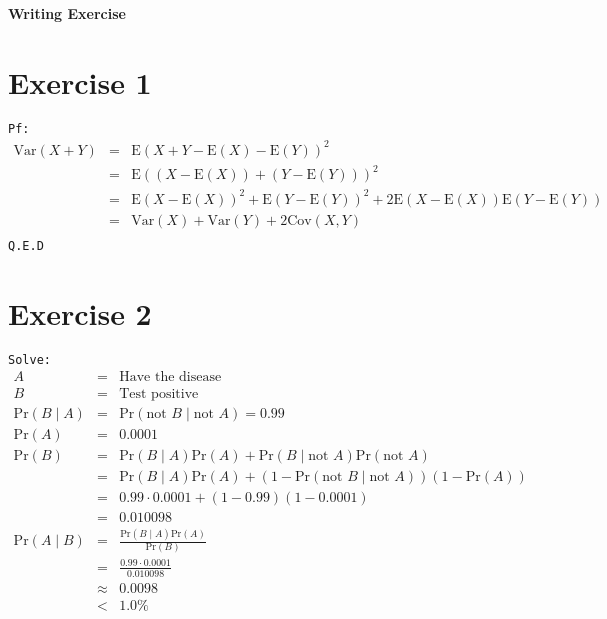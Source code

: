 \documentclass[a4paper]{article}
\newcommand{\E}{\mathrm{E}}
\newcommand{\Var}{\mathrm{Var}}
\newcommand{\Cov}{\mathrm{Cov}}
\newcommand{\Mypr}{\mathrm{Pr}}
\begin{document}
\begin{center}
\textbf{\huge Writing Exercise}
\end{center}
\section{Exercise 1}
\texttt{Pf:}
\begin{eqnarray*}
	\Var{(X+Y)} &=& \E{(X+Y-\E{(X)}-\E{(Y)})}^2 \\
	&=&\E{((X-\E{(X)})+(Y-\E{(Y)}))}^2 \\
	&=&\E{(X-\E{(X)})}^2 + \E{(Y-\E{(Y)})}^2  + 2\E{(X-\E{(X)})}\E{(Y-\E{(Y)})}      \\
	&=&\Var{(X)} + \Var{(Y)} + 2\Cov{(X,Y)} \\
\end{eqnarray*}
\texttt{Q.E.D}

\section{Exercise 2}
\texttt{Solve:}
\begin{eqnarray*}
	A &=& \text{Have the disease} \\
	B &=& \text{Test positive} \\
	\Mypr{(B \mid A)} &=&  \Mypr{(\text{not }B \mid \text{not }A)} = 0.99 \\
	\Mypr{(A)} &=& 0.0001 \\	
	\Mypr{(B)} &=&  \Mypr{(B \mid A)}\Mypr{(A)} + \Mypr{(B \mid \text{not }A)}\Mypr{(\text{not }A)}\\
	&=& \Mypr{(B \mid A)}\Mypr{(A)} + (1-\Mypr{(\text{not }B \mid \text{not }A)})(1-\Mypr{(A)})\\
	&=& 0.99 \cdot 0.0001 + (1-0.99)(1-0.0001) \\
	&=& 0.010098 \\
	\Mypr{(A \mid B)} &=& \frac{\Mypr{(B \mid A)}\Mypr{(A)}}{\Mypr{(B)}} \\
	&=& \frac{0.99 \cdot 0.0001 }{0.010098} \\
	& \approx & 0.0098 \\
	& < & 1.0\%
\end{eqnarray*}

\newcommand{\der}{\mathrm{d}}
\newcommand{\Myl}{\mathit{l}}
\end{document}
